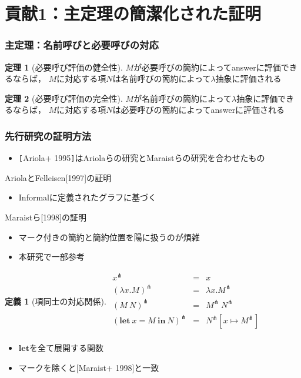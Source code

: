 \documentclass[dvipdfmx,cjk,xcolor=dvipsnames,envcountsect,notheorems,12pt]{beamer}
\theoremstyle{definition}
\newtheorem{definition}{定義}
\newtheorem{theorem}{定理}
\newcommand{\LET}[3]{\mathbf{let}~#1=#2~\mathbf{in}~#3}
\newcommand{\EXPANDLET}[1]{#1^\pitchfork}
\begin{document}
\section{貢献1：主定理の簡潔化された証明}

\begin{frame}
	\frametitle{主定理：名前呼びと必要呼びの対応}
	\large
	\begin{theorem}[必要呼び評価の健全性]
		$M$が必要呼びの簡約によってanswerに評価できるならば，
		$M$に対応する項$N$は名前呼びの簡約によって$\lambda$抽象に評価される
	\end{theorem}
	\begin{theorem}[必要呼び評価の完全性]
		$M$が名前呼びの簡約によって$\lambda$抽象に評価できるならば，
		$M$に対応する項$N$は必要呼びの簡約によってanswerに評価される
	\end{theorem}
\end{frame}

\begin{frame}[fragile]
	\frametitle{先行研究の証明方法}
	\begin{itemize}
		\item \verb|[|Ariola+ 1995\verb|]|はAriolaらの研究とMaraistらの研究を合わせたもの
	\end{itemize}
	\begin{itembox}[c]{AriolaとFelleisen[1997]の証明}
		\begin{itemize}
			\item Informalに定義されたグラフに基づく
		\end{itemize}
	\end{itembox}
	\begin{itembox}[c]{Maraistら[1998]の証明}
		\begin{itemize}
			\item マーク付きの簡約と簡約位置を陽に扱うのが煩雑
			\item 本研究で一部参考
		\end{itemize}
	\end{itembox}
\end{frame}

\begin{frame}[fragile]
	\Large
	\begin{definition}[項同士の対応関係]
	$\begin{array}{rcl}
		\EXPANDLET{x} & = & x \\
		\EXPANDLET{(\lambda x. M)} & = & \lambda x. \EXPANDLET{M} \\
		\EXPANDLET{(M~N)} & = & \EXPANDLET{M}~\EXPANDLET{N} \\
		\EXPANDLET{(\LET{x}{M}{N})} & = & \EXPANDLET{N}[x \mapsto \EXPANDLET{M}] \\
	\end{array}$
	\end{definition}
	\begin{itemize}
		\item $\mathbf{let}$を全て展開する関数
		\item マークを除くと[Maraist+ 1998]と一致
	\end{itemize}
\end{frame}
\end{document}
